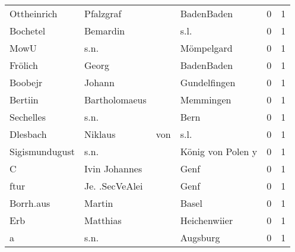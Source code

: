 \documentclass[10pt,a4paper,landscape]{article}
\begin{document}
\begin{longtable}{llllrr}
              Ottheinrich &                          Pfalzgraf &             &                                  BadenBaden &          0 &         1 \\
                 Bochetel &                           Bemardin &             &                                        s.l. &          0 &         1 \\
                     MowU &                               s.n. &             &                                  Mömpelgard &          0 &         1 \\
                  Frölich &                              Georg &             &                                  BadenBaden &          0 &         1 \\
                  Boobejr &                             Johann &             &                                Gundelfingen &          0 &         1 \\
                  Bertiin &                      Bartholomaeus &             &                                   Memmingen &          0 &         1 \\
                Sechelles &                               s.n. &             &                                        Bern &          0 &         1 \\
                 Dlesbach &                            Niklaus &         von &                                        s.l. &          0 &         1 \\
           Sigismundugust &                               s.n. &             &                           König von Polen y &          0 &         1 \\
                        C &                      Ivin Johannes &             &                                        Genf &          0 &         1 \\
                     ftur &                     Je. .SecVeAlei &             &                                        Genf &          0 &         1 \\
                Borrh.aus &                             Martin &             &                                       Basel &          0 &         1 \\
                      Erb &                           Matthias &             &                                Heichenwiier &          0 &         1 \\
                        a &                               s.n. &             &                                    Augsburg &          0 &         1 \\

\end{longtable}
\end{document}
